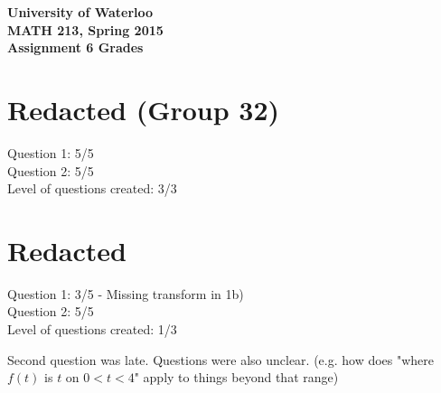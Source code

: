 \documentclass[12pt]{article}
\begin{document}
\begin{center}
{\Large\bf University of Waterloo}\\
\vspace{3mm}
{\Large\bf MATH 213, Spring 2015}\\
\vspace{2mm}
{\Large\bf Assignment 6 Grades}\\
\end{center}

\section*{Redacted (Group 32)}

Question 1: 5/5 \\
Question 2: 5/5 \\

\noindent Level of questions created: 3/3

\section*{Redacted}

Question 1: 3/5 - Missing transform in 1b) \\
Question 2: 5/5 \\

\noindent Level of questions created: 1/3

Second question was late. Questions were also unclear.
(e.g. how does "where $f(t)$ is $t$ on $0 < t < 4$" apply to things beyond that range)
\end{document}
